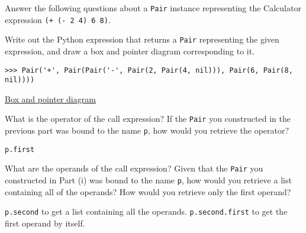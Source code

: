 \question Answer the following questions about a {\tt Pair} instance
representing the Calculator expression \texttt{(+ (- 2 4) 6 8)}.

\begin{blocksection}
\begin{subparts}
\subpart Write out the Python expression that returns a {\tt Pair}
representing the given expression, and draw a box and pointer diagram
corresponding to it.

\begin{solution}[0.4in]
\begin{lstlisting}
>>> Pair('+', Pair(Pair('-', Pair(2, Pair(4, nil))), Pair(6, Pair(8, nil))))
\end{lstlisting}
\href{https://goo.gl/2pxLFY}{Box and pointer diagram}
\end{solution}

\subpart What is the operator of the call expression? If the {\tt Pair}
you constructed in the previous part was bound to the name {\tt p}, how would
you retrieve the operator?

\begin{solution}[0.4in]
\texttt{p.first}
\end{solution}

\subpart What are the operands of the call expression? Given that the {\tt Pair}
you constructed in Part (i) was bound to the name {\tt p}, how would
you retrieve a list containing all of the operands? How would you retrieve
only the first operand?

\begin{solution}[0.4in]
\texttt{p.second} to get a list containing all the operands.
\texttt{p.second.first} to get the first operand by itself.
\end{solution}
\end{subparts}
\end{blocksection}
